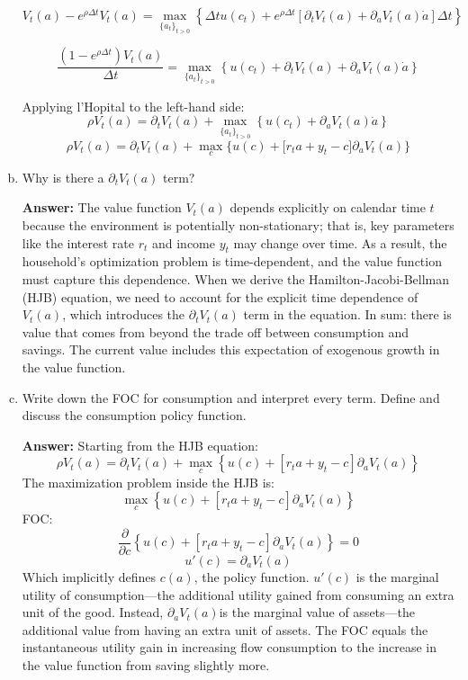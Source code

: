 \documentclass[11pt]{extarticle}
\theoremstyle{plain}
\theoremstyle{definition}
\begin{document}
\begin{enumerate}[(a)]
\[
V_t(a) - e^{\rho \Delta t} V_t(a) = 	\max_{\{a_t\}_{t>0}} \left\{\Delta t u(c_t) + e^{\rho \Delta t}[\partial_t V_t(a) + \partial_a V_t(a) \dot a]\Delta t\right\}
\]

\[
\frac{(1 - e^{\rho \Delta t})V_t(a)}{\Delta t} = 	\max_{\{a_t\}_{t>0}} \left\{ u(c_t) + \partial_t V_t(a) + \partial_a V_t(a) \dot a\right\}
\]

Applying l'Hopital to the left-hand side:
\[
\rho V_t(a) = \partial_t V_t(a) + \max_{\{a_t\}_{t>0}} \left\{ u(c_t) + \partial_a V_t(a) \dot a\right\}
\]
\begin{equation*}
	\rho V_t(a) = \partial_t V_t(a) + \max_c \bigg\{ u(c) + \Big[ r_t a + y_t - c \Big] \partial_a V_t(a) \bigg\}
\end{equation*}

\item Why is there a $\partial_t V_t(a)$ term? 

\textbf{Answer:} 
 The value function \(V_t(a)\) depends explicitly on calendar time \(t\) because the environment is potentially non-stationary; that is, key parameters like the interest rate \(r_t\) and income \(y_t\) may change over time. As a result, the household's optimization problem is time-dependent, and the value function must capture this dependence. When we derive the Hamilton-Jacobi-Bellman (HJB) equation, we need to account for the explicit time dependence of \(V_t(a)\), which introduces the \(\partial_t V_t(a)\) term in the equation. In sum: there is value that comes from beyond the trade off between consumption and savings. The current value includes this expectation of exogenous growth in the value function.    

\item Write down the FOC for consumption and interpret every term. Define and discuss the consumption policy function. 

\textbf{Answer:} 
    Starting from the HJB equation:
    \[
    \rho V_t(a) = \partial_t V_t(a) + \max_c \left\{ u(c) + \left[ r_t a + y_t - c \right] \partial_a V_t(a) \right\}
    \]
    The maximization problem inside the HJB is:
    \[
    \max_c \left\{ u(c) + \left[ r_t a + y_t - c \right] \partial_a V_t(a) \right\}
    \]
    FOC:
    \[
    \frac{\partial}{\partial c} \left\{ u(c) + \left[ r_t a + y_t - c \right] \partial_a V_t(a) \right\} = 0
    \]
    \[
    u'(c) = \partial_a V_t(a)
    \]
    Which implicitly defines $c(a)$, the policy function.
    \(u'(c)\) is the marginal utility of consumption—the additional utility gained from consuming an extra unit of the good. Instead, \(\partial_a V_t(a)\)is the marginal value of assets—the additional value from having an extra unit of assets. The FOC equals the instantaneous utility gain in increasing flow consumption to the increase in the value function from saving slightly more.


\end{enumerate}
\end{document}
